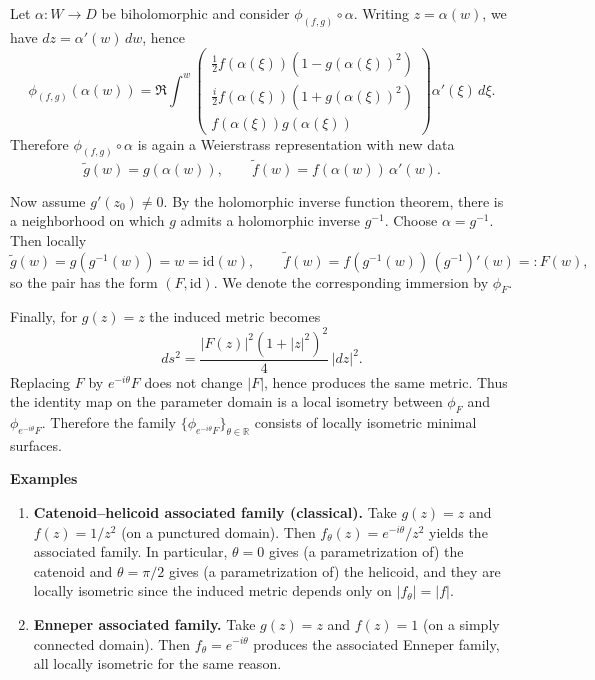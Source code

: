 \begin{solution}
Let $\alpha:W\to D$ be biholomorphic and consider $\phi_{(f,g)}\circ\alpha$. Writing $z=\alpha(w)$, we have
$dz=\alpha'(w)\,dw$, hence
\[
\phi_{(f,g)}(\alpha(w))
=
\Re\int^w
\begin{pmatrix}
\tfrac12 f(\alpha(\xi))(1-g(\alpha(\xi))^2)\\
\tfrac{i}{2}f(\alpha(\xi))(1+g(\alpha(\xi))^2)\\
f(\alpha(\xi))g(\alpha(\xi))
\end{pmatrix}
\alpha'(\xi)\,d\xi.
\]
Therefore $\phi_{(f,g)}\circ\alpha$ is again a Weierstrass representation with new data
\[
\tilde g(w)=g(\alpha(w)),\qquad
\tilde f(w)=f(\alpha(w))\,\alpha'(w).
\]

Now assume $g'(z_0)\neq 0$. By the holomorphic inverse function theorem, there is a neighborhood on which $g$ admits a
holomorphic inverse $g^{-1}$. Choose $\alpha=g^{-1}$. Then locally
\[
\tilde g(w)=g(g^{-1}(w))=w=\mathrm{id}(w),
\qquad
\tilde f(w)= f(g^{-1}(w))\,(g^{-1})'(w)=:F(w),
\]
so the pair has the form $(F,\mathrm{id})$. We denote the corresponding immersion by $\phi_F$.

Finally, for $g(z)=z$ the induced metric becomes
\[
ds^2=\frac{|F(z)|^2(1+|z|^2)^2}{4}\,|dz|^2.
\]
Replacing $F$ by $e^{-i\theta}F$ does not change $|F|$, hence produces the same metric. Thus the identity map on the
parameter domain is a local isometry between $\phi_F$ and $\phi_{e^{-i\theta}F}$. Therefore the family
$\{\phi_{e^{-i\theta}F}\}_{\theta\in\mathbb{R}}$ consists of locally isometric minimal surfaces.

\medskip

\par\medskip\noindent\textbf{Examples}\par\smallskip

\begin{enumerate}
	\item \textbf{Catenoid--helicoid associated family (classical).}
	Take $g(z)=z$ and $f(z)=1/z^2$ (on a punctured domain). Then $f_\theta(z)=e^{-i\theta}/z^2$ yields the associated family.
	In particular, $\theta=0$ gives (a parametrization of) the catenoid and $\theta=\pi/2$ gives (a parametrization of) the
	helicoid, and they are locally isometric since the induced metric depends only on $|f_\theta|=|f|$.
	
	\item \textbf{Enneper associated family.}
	Take $g(z)=z$ and $f(z)=1$ (on a simply connected domain). Then $f_\theta=e^{-i\theta}$ produces the associated Enneper
	family, all locally isometric for the same reason.
\end{enumerate}


\end{solution}
